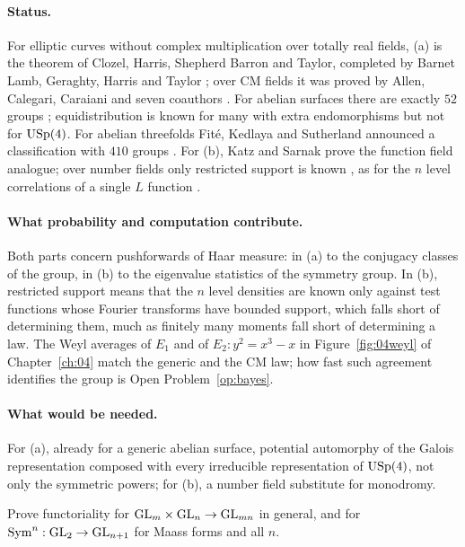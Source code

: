 \paragraph{Status.} For elliptic curves without complex multiplication over totally real fields, (a) is the theorem of Clozel, Harris, Shepherd Barron and Taylor, completed by Barnet Lamb, Geraghty, Harris and Taylor \cite{cht2008,hsbt2010,taylor2008,blght2011}; over CM fields it was proved by Allen, Calegari, Caraiani and seven coauthors \cite{allen2023}. For abelian surfaces there are exactly $52$ groups \cite{fkrs2012}; equidistribution is known for many with extra endomorphisms \cite{johansson2017} but not for $\mathrm{USp}(4)$. For abelian threefolds Fit\'e, Kedlaya and Sutherland announced a classification with $410$ groups \cite{fks2021}. For (b), Katz and Sarnak \cite{katzsarnak1999,katzsarnak1999b} prove the function field analogue; over number fields only restricted support is known \cite{ils2000}, as for the $n$ level correlations of a single $L$ function \cite{rudnicksarnak1996}.

\paragraph{What probability and computation contribute.} Both parts concern pushforwards of Haar measure: in (a) to the conjugacy classes of the group, in (b) to the eigenvalue statistics of the symmetry group. In (b), restricted support means that the $n$ level densities are known only against test functions whose Fourier transforms have bounded support, which falls short of determining them, much as finitely many moments fall short of determining a law. The Weyl averages of $E_1$ and of $E_2\colon y^2=x^3-x$ in Figure~\ref{fig:04weyl} of Chapter~\ref{ch:04} match the generic and the CM law; how fast such agreement identifies the group is Open Problem~\ref{op:bayes}.

\paragraph{What would be needed.} For (a), already for a generic abelian surface, potential automorphy of the Galois representation composed with every irreducible representation of $\mathrm{USp}(4)$, not only the symmetric powers; for (b), a number field substitute for monodromy.

\begin{problem}\label{op:funct}
Prove functoriality for $\mathrm{GL}_m\times\mathrm{GL}_n\to\mathrm{GL}_{mn}$ in general, and for $\operatorname{Sym}^n:\mathrm{GL}_2\to\mathrm{GL}_{n+1}$ for Maass forms and all $n$.
\end{problem}

